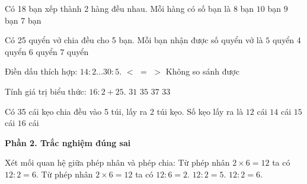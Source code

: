 \begin{ex} %
Có 18 bạn xếp thành 2 hàng đều nhau. Mỗi hàng có số bạn là
\choice
{$8$ bạn}
{$10$ bạn}
{\True $9$ bạn}
{$7$ bạn}
\end{ex}

\begin{ex} %
Có 25 quyển vở chia đều cho 5 bạn. Mỗi bạn nhận được số quyển vở là
\choice
{\True $5$ quyển}
{$4$ quyển}
{$6$ quyển}
{$7$ quyển}
\end{ex}

\begin{ex} %
Điền dấu thích hợp: $14 : 2 \dots 30 : 5$.
\choice
{$<$}
{$=$}
{\True $>$}
{Không so sánh được}
\end{ex}

\begin{ex} %
Tính giá trị biểu thức: $16 : 2 + 25$.
\choice
{$31$}
{$35$}
{$37$}
{\True $33$}
\end{ex}

\begin{ex} %
Có 35 cái kẹo chia đều vào 5 túi, lấy ra 2 túi kẹo. Số kẹo lấy ra là
\choice
{$12$ cái}
{\True $14$ cái}
{$15$ cái}
{$16$ cái}
\end{ex}

\textbf{Phần 2. Trắc nghiệm đúng sai}

\begin{ex} %
Xét mối quan hệ giữa phép nhân và phép chia:
\choiceTF
{\True Từ phép nhân $2 \times 6 = 12$ ta có $12 : 2 = 6$.}
{\True Từ phép nhân $2 \times 6 = 12$ ta có $12 : 6 = 2$.}
{$12 : 2 = 5$.}
{\True $12 : 2 = 6$.}
\end{ex}

